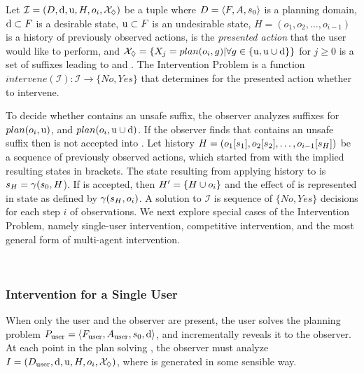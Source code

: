 \begin{definition}
  \label{def:standard}
  Let $\mathcal{I} = (D, \mathrm{d}, \mathrm{u}, H, o_i, \mathcal{X}_\Diamond)$ be a tuple where
  $D=\langle F, A, s_0 \rangle$ is a planning domain,
  $\mathrm{d} \subset F$ is a desirable state,
  $\mathrm{u} \subset F$ is an undesirable state,
  $H = (o_1, o_2, \ldots, o_{i-1})$ is a history of previously observed actions,
  \presentedAction is the \emph{presented action} that the user would like to perform, and
  $\mathcal{X}_\Diamond = \{ X_j = plan( o_i, g) | \forall g \in \{\mathrm{u}, \mathrm{u}\cup\mathrm{d}\} \}$ for $j \geq 0$ is a set of suffixes leading to \undesired and \dandu.
The \textnormal{Intervention Problem} is a function $intervene (\mathcal{I}) :  \mathcal{I} \rightarrow \{No, Yes\} $
that determines for the presented action \presentedAction whether to intervene.
\end{definition}
\noindent
To decide whether \Suffixes contains an unsafe suffix, the observer analyzes suffixes for 
   $plan(o_i, \mathrm{u})$, and
   $plan(o_i, \mathrm{u}\cup\mathrm{d})$.  
If the observer finds that \Suffixes contains an unsafe suffix then \presentedAction is not accepted into \historyDef.
Let history  $H = ( o_1 [s_1], o_2 [s_2], \ldots, o_{i-1} [s_{H}])$  be a sequence of previously observed actions, which started from \initialState with the implied resulting states in brackets.
The state resulting from applying history to \initialState is $s_{H} = \gamma(s_0, H$).
If \presentedAction is accepted, then  $H'=\lbrace H\cup o_i\rbrace$ and the effect of \presentedAction is represented in state as defined by $\gamma(s_{H}, o_i)$.
A solution to $\mathcal{I}$  is sequence of $\{No, Yes \}$ decisions for each step $i$ of observations.
We next explore special cases of the Intervention Problem, namely single-user intervention, competitive intervention, and the most general form of multi-agent intervention.

~\subsubsection{Intervention for a Single User}
When only the user and the observer are present, the user solves the planning problem $P_{\textnormal{user}}=\langle F_{\textnormal{user}}, A_{\textnormal{user}}, s_0, \mathrm{d}\rangle$, and incrementally reveals it to the observer. 
At each point in the plan solving \problemUser, the observer must analyze $I = (D_{\textnormal{user}}, \mathrm{d}, \mathrm{u}, H, o_i, \mathcal{X}_\Diamond)$, where \Suffixes is generated in some sensible way.

